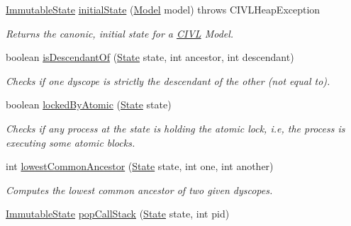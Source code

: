 \begin{DoxyCompactItemize}
\hyperlink{classedu_1_1udel_1_1cis_1_1vsl_1_1civl_1_1state_1_1common_1_1immutable_1_1ImmutableState}{Immutable\+State} \hyperlink{classedu_1_1udel_1_1cis_1_1vsl_1_1civl_1_1state_1_1common_1_1immutable_1_1ImmutableStateFactory_a6a8e3b14776e73ce1d08b175e3012cbd}{initial\+State} (\hyperlink{interfaceedu_1_1udel_1_1cis_1_1vsl_1_1civl_1_1model_1_1IF_1_1Model}{Model} model)  throws C\+I\+V\+L\+Heap\+Exception 
\begin{DoxyCompactList}\small\item\em Returns the canonic, initial state for a \hyperlink{classedu_1_1udel_1_1cis_1_1vsl_1_1civl_1_1CIVL}{C\+I\+V\+L} Model. \end{DoxyCompactList}\item 
boolean \hyperlink{classedu_1_1udel_1_1cis_1_1vsl_1_1civl_1_1state_1_1common_1_1immutable_1_1ImmutableStateFactory_af29c3918cae07c8e2689445dde49d065}{is\+Descendant\+Of} (\hyperlink{interfaceedu_1_1udel_1_1cis_1_1vsl_1_1civl_1_1state_1_1IF_1_1State}{State} state, int ancestor, int descendant)
\begin{DoxyCompactList}\small\item\em Checks if one dyscope is strictly the descendant of the other (not equal to). \end{DoxyCompactList}\item 
boolean \hyperlink{classedu_1_1udel_1_1cis_1_1vsl_1_1civl_1_1state_1_1common_1_1immutable_1_1ImmutableStateFactory_a5fd6c8dfda79abc673ed958993b8cff2}{locked\+By\+Atomic} (\hyperlink{interfaceedu_1_1udel_1_1cis_1_1vsl_1_1civl_1_1state_1_1IF_1_1State}{State} state)
\begin{DoxyCompactList}\small\item\em Checks if any process at the state is holding the atomic lock, i.\+e, the process is executing some atomic blocks. \end{DoxyCompactList}\item 
int \hyperlink{classedu_1_1udel_1_1cis_1_1vsl_1_1civl_1_1state_1_1common_1_1immutable_1_1ImmutableStateFactory_ad7bebd102aa4e515f7a532cb50751c46}{lowest\+Common\+Ancestor} (\hyperlink{interfaceedu_1_1udel_1_1cis_1_1vsl_1_1civl_1_1state_1_1IF_1_1State}{State} state, int one, int another)
\begin{DoxyCompactList}\small\item\em Computes the lowest common ancestor of two given dyscopes. \end{DoxyCompactList}\item 
\hyperlink{classedu_1_1udel_1_1cis_1_1vsl_1_1civl_1_1state_1_1common_1_1immutable_1_1ImmutableState}{Immutable\+State} \hyperlink{classedu_1_1udel_1_1cis_1_1vsl_1_1civl_1_1state_1_1common_1_1immutable_1_1ImmutableStateFactory_a3f70888fd06f2a1c4a72393cc2345531}{pop\+Call\+Stack} (\hyperlink{interfaceedu_1_1udel_1_1cis_1_1vsl_1_1civl_1_1state_1_1IF_1_1State}{State} state, int pid)

\end{DoxyCompactItemize}
